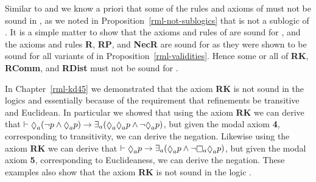 Similar to \logicRmlKFF{} and \logicRmlKD{} we know a priori that some of the rules and axioms of \axiomRmlK{} must not be sound in \logicRmlS{}, as we noted in Proposition~\ref{rml-not-sublogics} that \logicRmlK{} is not a sublogic of \logicRmlS{}.
It is a simple matter to show that the axioms and rules of \axiomS{} are sound for \logicRmlS{}, and the axioms and rules {\bf R}, {\bf RP}, and {\bf NecR} are sound for \logicRmlS{} as they were shown to be sound for all variants of \logicRml{} in Proposition~\ref{rml-validities}.
Hence some or all of {\bf RK}, {\bf RComm}, and {\bf RDist} must not be sound for \logicRmlS{}. 

In Chapter~\ref{rml-kd45} we demonstrated that the \axiomRmlK{} axiom {\bf RK} is not sound in the logics \logicRmlKFF{} and \logicRmlKD{} essentially because of the requirement that refinements be transitive and Euclidean.
In particular we showed that using the axiom {\bf RK} we can derive that $\proves \possibleA (\lnot \atomP \land \possibleA \atomP) \implies \somerefsA (\possibleA \possibleA \atomP \land \lnot \possibleA \atomP)$, but given the modal axiom {\bf 4}, corresponding to transitivity, we can derive the negation.
Likewise using the \axiomRmlK{} axiom {\bf RK} we can derive that $\proves \possibleA \atomP \implies \somerefsA (\possibleA \atomP \land \lnot \necessaryA \possibleA \atomP)$, but given the modal axiom {\bf 5}, corresponding to Euclideaness, we can derive the negation.
These examples also show that the axiom {\bf RK} is not sound in the logic \logicRmlS{}.

